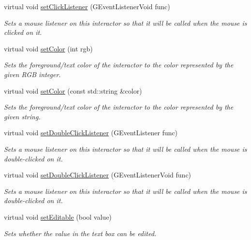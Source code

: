 \begin{DoxyCompactItemize}
virtual void \mbox{\hyperlink{classGInteractor_a856414c92df90f56f3877475eb3f8fc4}{set\+Click\+Listener}} (G\+Event\+Listener\+Void func)
\begin{DoxyCompactList}\small\item\em Sets a mouse listener on this interactor so that it will be called when the mouse is clicked on it. \end{DoxyCompactList}\item 
virtual void \mbox{\hyperlink{classGInteractor_ab1f5cc0f5cc6bbbd716a526c61f1081d}{set\+Color}} (int rgb)
\begin{DoxyCompactList}\small\item\em Sets the foreground/text color of the interactor to the color represented by the given R\+GB integer. \end{DoxyCompactList}\item 
virtual void \mbox{\hyperlink{classGInteractor_a61374df6c11b52cfbb0815decdbaebc6}{set\+Color}} (const std\+::string \&color)
\begin{DoxyCompactList}\small\item\em Sets the foreground/text color of the interactor to the color represented by the given string. \end{DoxyCompactList}\item 
virtual void \mbox{\hyperlink{classGInteractor_ac29f9a3462458e165fae3a1f046ee77a}{set\+Double\+Click\+Listener}} (G\+Event\+Listener func)
\begin{DoxyCompactList}\small\item\em Sets a mouse listener on this interactor so that it will be called when the mouse is double-\/clicked on it. \end{DoxyCompactList}\item 
virtual void \mbox{\hyperlink{classGInteractor_a50096194d66f48c92dd4c512d41bfc76}{set\+Double\+Click\+Listener}} (G\+Event\+Listener\+Void func)
\begin{DoxyCompactList}\small\item\em Sets a mouse listener on this interactor so that it will be called when the mouse is double-\/clicked on it. \end{DoxyCompactList}\item 
virtual void \mbox{\hyperlink{classGTextField_a008d7fd44fb3e7a6886cdaddbc3644a2}{set\+Editable}} (bool value)
\begin{DoxyCompactList}\small\item\em Sets whether the value in the text box can be edited. \end{DoxyCompactList}\item 

\end{DoxyCompactItemize}
